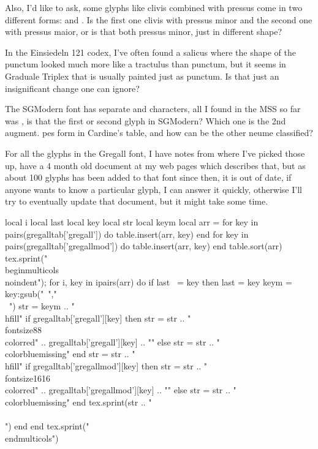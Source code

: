 \documentclass[a4paper]{article}
\begin{document}
Also, I'd like to ask, some glyphs like clivis combined with pressus come
in two different forms:
\quad{}\quad and
\quad{}\quad.  Is the first one clivis with
pressus minor and the second one with pressus maior, or is that both pressus
minor, just in different shape?

In the Einsiedeln 121 codex, I've often found a salicus where the shape of
the punctum looked much more like a tractulus than punctum, but it seems
in Graduale Triplex that is usually painted just as punctum.  Is that just
an insignificant change one can ignore?

The SGModern font has separate {\fontsize{16}{16}\color{red}\GreGallModern{}}\quad and \quad
characters, all I found in the MSS so far was \quad, is that
the first or second glyph in SGModern?  Which one is the 2nd augment. pes form in
Cardine's table, and how can be the other neume classified?

For all the glyphs in the Gregall font, I have notes from where I've picked
those up, have a 4 month old document at my web pages which describes that,
but as about 100 glyphs has been added to that font since then, it is out of
date, if anyone wants to know a particular glyph, I can answer it quickly,
otherwise I'll try to eventually update that document, but it might take
some time.

\begin{luacode*}
  local i
  local last
  local key
  local str
  local keym
  local arr = {}
  for key in pairs(gregalltab['gregall']) do
    table.insert(arr, key)
  end
  for key in pairs(gregalltab['gregallmod']) do
    table.insert(arr, key)
  end
  table.sort(arr)
  tex.sprint("\\begin{multicols}{3}\\noindent");
  for i, key in ipairs(arr) do
    if last ~= key then
      last = key
      keym = key:gsub("~","\\~{}")
      str = keym .. "\\hfill"
      if gregalltab['gregall'][key] then
        str = str .. "{\\fontsize{8}{8}\\color{red}" .. gregalltab['gregall'][key] .. "}"
      else
        str = str .. "{\\color{blue}missing}"
      end
      str = str .. "\\hfill"
      if gregalltab['gregallmod'][key] then
        str = str .. "{\\fontsize{16}{16}\\color{red}" .. gregalltab['gregallmod'][key] .. "}"
      else
        str = str .. "{\\color{blue}missing}"
      end
      tex.sprint(str .. "\\\\")
    end
  end
  tex.sprint("\\end{multicols}")
\end{luacode*}
\end{document}
